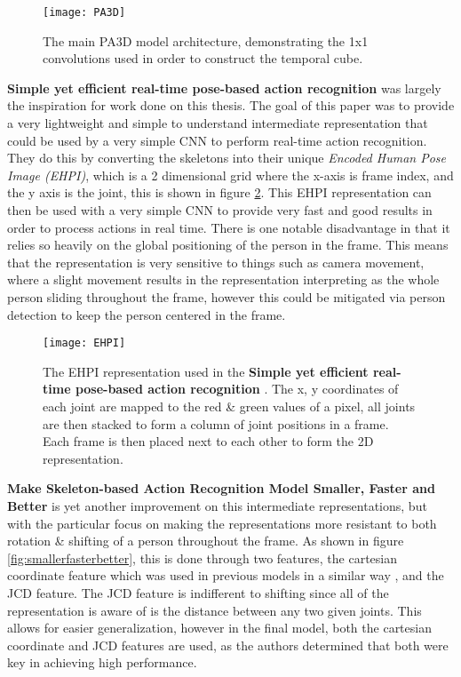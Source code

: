 \begin{figure}[ht]
	\texttt{[image: PA3D]}
	\centering
	\caption{The main PA3D \cite{PA3D} model architecture, demonstrating the 1x1 convolutions used in order to construct the temporal cube.}
	\label{fig:PA3D}
\end{figure}

\textbf{Simple yet efficient real-time pose-based action recognition} \cite{simple_yet_efficient} was largely the inspiration for work done on this thesis. The goal of this paper was to provide a very lightweight and simple to understand intermediate representation that could be used by a very simple CNN to perform real-time action recognition. They do this by converting the skeletons into their unique \textit{Encoded Human Pose Image (EHPI)}, which is a 2 dimensional grid where the x-axis is frame index, and the y axis is the joint, this is shown in figure \ref{fig:EHPI}. This EHPI representation can then be used with a very simple CNN to provide very fast and good results in order to process actions in real time. There is one notable disadvantage in that it relies so heavily on the global positioning of the person in the frame. This means that the representation is very sensitive to things such as camera movement, where a slight movement results in the representation interpreting as the whole person sliding throughout the frame, however this could be mitigated via person detection to keep the person centered in the frame.

\begin{figure}[ht]
	\texttt{[image: EHPI]}
	\centering
	\caption{The EHPI representation used in the \textbf{Simple yet efficient real-time pose-based action recognition} \cite{simple_yet_efficient}. The x, y coordinates of each joint are mapped to the red \& green values of a pixel, all joints are then stacked to form a column of joint positions in a frame. Each frame is then placed next to each other to form the 2D representation.}
	\label{fig:EHPI}
\end{figure}

\textbf{Make Skeleton-based Action Recognition Model Smaller, Faster and Better} \cite{smaller_faster_better} is yet another improvement on this intermediate representations, but with the particular focus on making the representations more resistant to both rotation \& shifting of a person throughout the frame.  As shown in figure \ref{fig:smallerfasterbetter}, this is done through two features, the cartesian coordinate feature which was used in previous models in a similar way \cite{simple_yet_efficient}, and the JCD feature. The JCD feature is indifferent to shifting since all of the representation is aware of is the distance between any two given joints. This allows for easier generalization, however in the final model, both the cartesian coordinate and JCD features are used, as the authors determined that both were key in achieving high performance.

